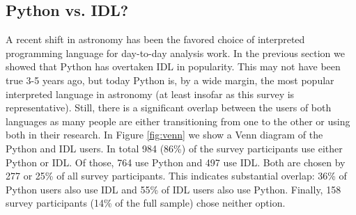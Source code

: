 \subsection{Python vs. IDL?}

A recent shift in astronomy has been the favored choice of interpreted programming language for day-to-day analysis work. In the previous section we showed that Python has overtaken IDL in popularity. This may not have been true 3-5 years ago, but today Python is, by a wide margin, the most popular interpreted language in astronomy (at least insofar as this survey is representative). Still, there is a significant overlap between the users of both languages as many people are either transitioning from one to the other or using both in their research. In Figure \ref{fig:venn} we show a Venn diagram of the Python and IDL users. In total 984 (86\%) of the survey participants use either Python or IDL. Of those, 764 use Python and 497 use IDL. Both are chosen by 277 or 25\% of all survey participants. This indicates substantial overlap: 36\% of Python users also use IDL and 55\% of IDL users also use Python. Finally, 158 survey participants (14\% of the full sample) chose neither option.

    